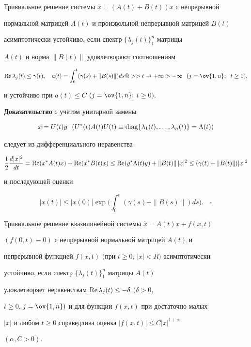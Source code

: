 \begin{thm}


Тривиальное решение системы $\Dot x=(A(t)+B(t))x$ с непрерывной 


нормальной матрицей $A(t)$ и произвольной непрерывной матрицей $B(t)$ 


асимптотически устойчиво, если спектр $\{\lambda_j(t)\}^n_1$ матрицы 


$A(t)$ и норма $\|B(t)\|$ удовлетворяют соотношениям


$$


\re\lambda_j(t)\le\gamma(t),\quad


a(t)=\int^t_0(\gamma(s)+\|B(s)\|)ds


@>>{t\to+\infty}>-\infty\ \ (j=\ov{1,n};\ \; t\ge0),


$$


и устойчиво при $a(t)\le C$ $(j=\ov{1,n};$ $t\ge0)$.


\end{thm}





{\bf Доказательство} с учетом унитарной замены


$$x=U(t)y \ \


(U^*(t)A(t)U(t)\equiv\diag\{\lambda_1(t),\dotsc,\lambda_n(t)\}= 


\Lambda(t))


$$


следует из дифференциального неравенства


$$


\frac{1}{2}\frac{d|x|^2}{d t}=\re(x^*A(t)x)+\re(x^*B(t)x)\le 


\re(y^*\Lambda(t)y)+\|B(t)\|\,|x|^2\le


(\gamma(t)+\|B(t)\|)|x|^2


$$


и последующей оценки


$$


|x(t)|\le|x(0)|\exp\bigg(\int^t_0(\gamma(s)+\|B(s)\|)ds \bigg).\quad\square


$$





\begin{thm}


Тривиальное решение квазилинейной системы $\Dot x=A(t)x+f(x,t)$ 


$(f(0,t)\equiv0)$ с непрерывной нормальной матрицей $A(t)$ и 


непрерывной функцией $f(x,t)$ $($при $t\ge0$, $|x|<R)$ асимптотически 


устойчиво, если спектр $\{\lambda_j(t)\}^n_1$ матрицы $A(t)$ 


удовлетворяет неравенствам $\operatorname{Re}\lambda_j(t)\le-\delta$ $(\delta>0$, 


$t\ge0$, $j=\ov{1,n})$ и для функции $f(x,t)$ при достаточно малых 


$|x|$ и любом $t\ge0$ справедлива оценка $|f(x,t)|\le C|x|^{1+\alpha}$ 


$(\alpha,C>0)$.


\end{thm}






